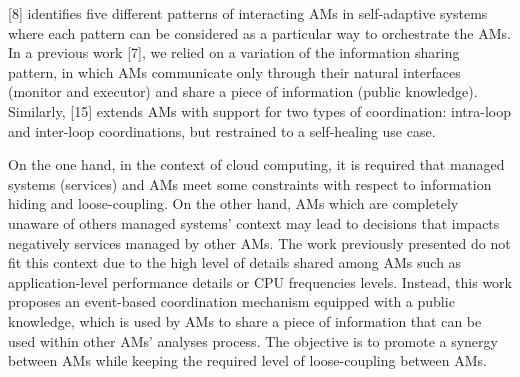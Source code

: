 [8] identifies five different patterns of interacting AMs in
self-adaptive systems where each pattern can be considered as
a particular way to orchestrate the AMs. In a previous work [7],
we relied on a variation of the information sharing pattern, in
which AMs communicate only through their natural interfaces
(monitor and executor) and share a piece of information (public
knowledge). Similarly, [15] extends AMs with support for two
types of coordination: intra-loop and inter-loop coordinations,
but restrained to a self-healing use case.

On the one hand, in the context of cloud computing, it is required that managed systems (services) and AMs meet some constraints with respect to information hiding and loose-coupling. On the other hand, AMs which are completely unaware of others managed systems’ context may lead to decisions that impacts negatively services managed by other AMs. The work previously presented do not fit this context due to the high level of details shared among AMs such as application-level performance details or CPU frequencies levels. Instead, this work proposes an event-based coordination mechanism equipped with a public knowledge, which is used by AMs to share a piece of information that can be used within other AMs’ analyses process. The objective is to promote a synergy between AMs while keeping the required level of loose-coupling between AMs.




